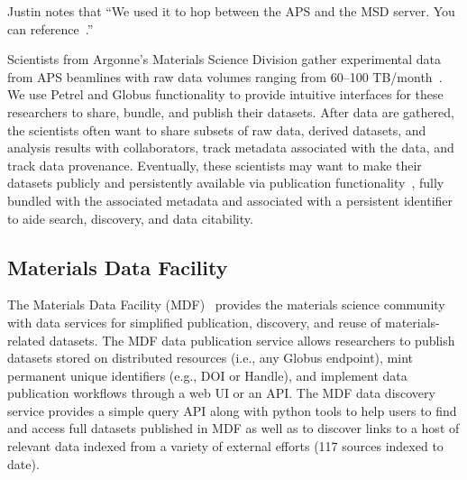 \documentclass[sigconf]{acmart}
\newcommand\ian[1]{}
\newcommand\ian[1]{{\color{blue}[Ian: #1]}}
\begin{document}
\ian{This section is rather weak: Not clear whether it is describing what IS done or what COULD be done. I pinged Justin to ask for info. Maybe delete?}

Justin notes that ``We used it to hop between the APS and the MSD server. You can reference~\cite{wozniak2015big}.''

Scientists from Argonne's Materials Science Division gather experimental data from APS beamlines with raw data volumes ranging from 60--100 TB/month~\cite{foster2015networking}. 
We use Petrel and Globus functionality to provide intuitive interfaces for these researchers to share, bundle, and publish their datasets. After data are gathered, the scientists often want to share subsets of raw data, derived datasets, and analysis results with collaborators, track metadata associated with the data, and track data provenance. 
Eventually, these scientists may want to make their datasets publicly and persistently available via publication functionality~\cite{chard2015globus}, fully bundled with the associated metadata and associated with a persistent identifier to aide search, discovery, and data citability.

\subsection{Materials Data Facility}

The Materials Data Facility (MDF)~\cite{MDF2016} provides the materials science community
with data services for simplified publication, discovery, and reuse of materials-related datasets. 
The MDF data publication service allows researchers to 
publish datasets stored on distributed resources (i.e., any Globus endpoint), mint permanent unique identifiers 
(e.g., DOI or Handle), and implement data publication workflows through a web UI or an API. The MDF data discovery service provides 
a simple query API along with python tools to help users to find and access full datasets published in MDF as well as to discover links to a host of relevant data indexed 
from a variety of external efforts (117 sources indexed to date). 
\end{document}
